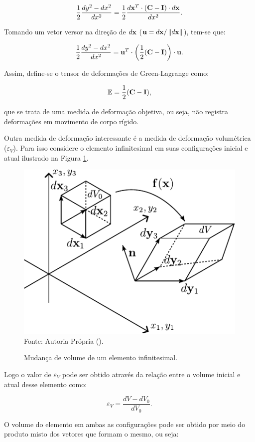 \documentclass[_ArquivoPrincipal.tex]{subfiles}
\begin{document}
\[
    \frac{1}{2}\frac{dy^2-dx^2}{dx^2}=\frac{1}{2}\frac{d\mathbf{x}^T\cdot(\mathbf{C}-\mathbf{I})\cdot d\mathbf{x}}{dx^2}\text{.}
\]

\noindent Tomando um vetor versor na direção de $d\mathbf{x}$ ($\mathbf{u}=d\mathbf{x}/\left\lVert{d\mathbf{x}}\right\lVert$), tem-se que:

\begin{equation}
    \frac{1}{2}\frac{dy^2-dx^2}{dx^2}=\mathbf{u}^T\cdot\left(\frac{1}{2}(\mathbf{C}-\mathbf{I})\right)\cdot\mathbf{u}\text{.}
\end{equation}

Assim, define-se o tensor de deformações de Green-Lagrange como:

\begin{equation}
    \mathbb{E}=\frac{1}{2}(\mathbf{C}-\mathbf{I})\text{,}
\end{equation}

\noindent que se trata de uma medida de deformação objetiva, ou seja, não registra deformações em movimento de corpo rígido.

Outra medida de deformação interessante é a medida de deformação volumétrica ($\varepsilon_V$). Para isso considere o elemento infinitesimal em suas configurações inicial e atual ilustrado na Figura \ref{fig:MudVol}.

\begin{figure}[h]
    \centering
    \caption{Mudança de volume de um elemento infinitesimal.}
    \includegraphics[width=0.5\linewidth]{Figuras/MudVol.pdf}
    \\Fonte: Autoria Própria (\the\year).
    \label{fig:MudVol}
\end{figure}

Logo o valor de $\varepsilon_V$ pode ser obtido através da relação entre o volume inicial e atual desse elemento como:

\begin{equation}
    \varepsilon_V=\frac{dV-dV_0}{dV_0}\text{.}
\end{equation}

O volume do elemento em ambas as configurações pode ser obtido por meio do produto misto dos vetores que formam o mesmo, ou seja:
\end{document}
